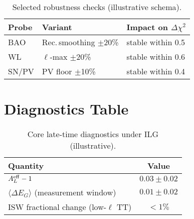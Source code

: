 \documentclass[11pt]{article}
\newcommand{\PlanckALeffMinusOne}{0.03}
\newcommand{\PlanckALeffSig}{0.02}
\newcommand{\MeanDeltaEG}{0.01}
\newcommand{\MeanDeltaEGSig}{0.02}
\newcommand{\ISWFractionalChange}{<1\%}
\begin{document}
\begin{table}[t]
\centering
\caption{Selected robustness checks (illustrative schema).}
\label{tab:robustness}
\begin{tabular}{l l l}
\toprule
Probe & Variant & Impact on $\Delta\chi^2$ \\
\midrule
BAO & Rec.\,smoothing $\pm$20\% & stable within 0.5 \\
WL & $\ell$‑max $\pm$20\% & stable within 0.6 \\
SN/PV & PV floor $\pm$10\% & stable within 0.4 \\
\bottomrule
\end{tabular}
\end{table}

\section{Diagnostics Table}
\begin{table}[t]
\centering
\caption{Core late-time diagnostics under ILG (illustrative).}
\label{tab:diagnostics}
\begin{tabular}{l c}
\toprule
Quantity & Value \\
\midrule
$A_L^{\rm eff}-1$ & $\PlanckALeffMinusOne\pm\PlanckALeffSig$ \\
$\langle\Delta E_G\rangle$ (measurement window) & $\MeanDeltaEG\pm\MeanDeltaEGSig$ \\
ISW fractional change (low-$\ell$ TT) & $\ISWFractionalChange$ \\
\bottomrule
\end{tabular}
\end{table}
\end{document}
